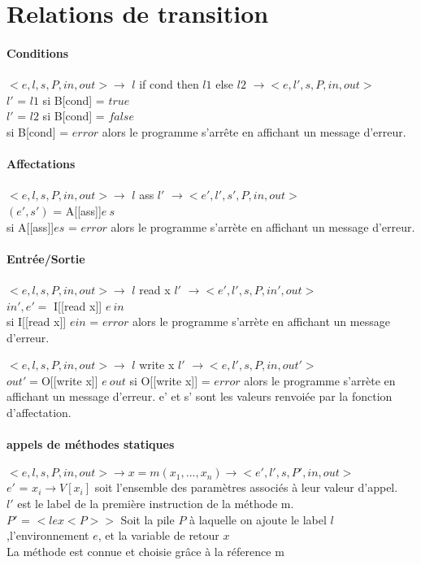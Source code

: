 \section{Relations de transition}
\paragraph{Conditions}
$<e,l,s,P,in,out> \rightarrow$ $l$ if cond then $l1$ else $l2$  $\rightarrow <e,l',s,P,in,out>$\\
$l'$ = $l1$ si B[cond] = $true$\\
$l'$ = $l2$ si B[cond] = $false$\\
si B[cond]  = $error$ alors le programme s'arrête en affichant un message d'erreur.

\paragraph{Affectations}
$<e,l,s,P,in,out> \rightarrow$ $l$ ass $l'$ $\rightarrow <e',l',s',P,in,out>$\\
$(e',s')$ = A[[ass]]$ e\: s$\\
si A[[ass]]$ e s$ = $error$ alors le programme s'arrète en affichant un message d'erreur.

\paragraph{Entrée/Sortie} 
$<e,l,s,P,in,out> \rightarrow$ $l$ read x $l'$  $\rightarrow <e',l',s,P,in',out>$\\
$in',e' = $ I[[read x]] $e\: in$\\
si I[[read x]] $e in$ = $error$ alors le programme s'arrète en affichant un message d'erreur.

$<e,l,s,P,in,out> \rightarrow$ $l$ write x $l'$  $\rightarrow <e,l',s,P,in,out'>$\\
$out' = $O[[write x]] $e\: out$
si O[[write x]] = $error$ alors le programme s'arrète en affichant un message d'erreur. 
e' et s' sont les valeurs renvoiée par la fonction d'affectation.

\paragraph{appels de méthodes statiques}
$<e,l,s,P,in,out> \rightarrow x = m(x_1,...,x_n) \rightarrow <e',l',s,P',in,out>$\\
$e'$ = $x_i \rightarrow V[x_i]$ soit l'ensemble des paramètres associés à leur valeur d'appel. \\
$l'$ est le label de la première instruction de la méthode m.\\
$P'$ = $ < l e x <P>>$ Soit la pile $P$ à laquelle on ajoute le label $l$,l'environnement $e$, et la variable de retour $x$\\
La méthode est connue et choisie grâce à la réference m


